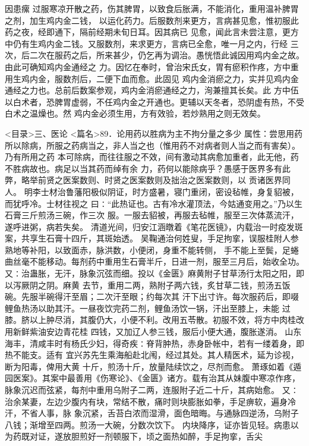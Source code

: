 \documentclass[a4paper,12pt,UTF8,twoside]{ctexbook}
\begin{document}
因患瘰 过服寒凉开散之药，伤其脾胃，以致食后胀满，不能消化，重用温补脾胃之剂，加生鸡内金二钱， 
以运化药力。后服数剂来更方，言病甚见愈，惟初服此药之夜，经即通下，隔前经期未旬日耳。因其病已 
见愈，闻此言未尝注意，更方中仍有生鸡内金二钱。又服数剂，来求更方，言病已全愈，唯一月之内，行经 
三次，后二次在服药之后，所来甚少，仍乞再为调治。愚恍悟此诚因用鸡内金之故。由此可确知鸡内金通经之 
力。因忆在奉时，曾治宋氏女，胃有瘀积作疼，方中重用生鸡内金，服数剂后，二便下血而愈。此固见 
鸡内金消瘀之力，实并见鸡内金通经之力也。总前后数案参观，鸡内金消瘀通经之力，洵兼擅其长矣。此 
方中伍以白术者，恐脾胃虚弱，不任鸡内金之开通也。更辅以天冬者，恐阴虚有热，不受白术之温燥也。然 
鸡内金必须生用，方有效验，若炒熟用之则无效矣。 

<目录>三、医论
<篇名>89．论用药以胜病为主不拘分量之多少
属性：尝思用药所以除病，所服之药病当之，非人当之也（惟用药不对病者则人当之而有害矣）。乃有所用之药 
本可除病，而往往服之不效，间有激动其病愈加重者，此无他，药不胜病故也。病足以当其药而绰有余 
力，药何以能除病乎？愚感于医界多有此弊，略举前贤之医案数则、时贤之医案数则及拙治之医案数则，以 
贡诸医界同人。 
明李士材治鲁藩阳极似阴证，时方盛暑，寝门重闭，密设毡帷，身复貂被，而犹呼冷。士材往视之 
曰∶“此热证也。古有冷水灌顶法，今姑通变用之。”乃以生石膏三斤煎汤三碗，作三次 
服。一服去貂被，再服去毡帷，服至三次体蒸流汗，遂呼进粥，病若失矣。 
清道光间，归安江涵暾着《笔花医镜》，内载治一时疫发斑案，共享生石膏十四斤，其斑始透。 
吴鞠通治何姓叟，手足拘挛，误服桂附人参熟地等补阳，以致面赤，脉洪数，小便闭，身重不能转侧， 
手不能上至鬓，足蜷曲丝毫不能移动。每剂药中重用生石膏半斤，日进一剂，服至三月后，始收全功。 
又∶治蛊胀，无汗，脉象沉弦而细。投以《金匮》麻黄附子甘草汤行太阳之阳，即以泻厥阴之阴。麻黄 
去节，重用二两，熟附子两六钱，炙甘草二钱，煎汤五饭碗。先服半碗得汗至眉；二次汗至眼；约每次其 
汗下出寸许。每次服药后，即啜鲤鱼热汤以助其汗。一昼夜饮完药二剂，鲤鱼汤饮一锅，汗出至膝上，未能 
过膝。脐以上肿尽消，其腹仍大，小便不利。改用五苓散。初服不效，将方中肉桂改用新鲜紫油安边青花桂 
四钱，又加辽人参三钱，服后小便大通，腹胀遂消。 
山东海丰，清咸丰时有杨氏少妇，得奇疾∶脊背肿热，赤身卧帐中，若有一缕着身，即热不能支。适有 
宜兴苏先生乘海船赴北闱，经过其处。其人精医术，延为诊视，断为阳毒，俾用大黄 
十斤，煎汤十斤，放量陆续饮之，尽剂而愈。 
萧琢如着《遁园医案》。其案中最善用《伤寒论》、《金匮》诸方。载有治其从妹腹中寒凉作疼， 
脉象沉迟而弦紧，每剂中重用乌附子二两，连服附子近二十斤，其病始愈。 
又∶治余某妻，左边少腹内有块，常结不散，痛时则块膨胀如拳，手足痹软，遍身冷汗，不省人事，脉 
象沉紧，舌苔白浓而湿滑，面色暗晦。与通脉四逆汤，乌附子八钱；渐增至四两。煎汤一大碗，分数次饮下。 
内块降序，证亦皆见轻。病患以为药既对证，遂放胆煎好一剂顿服下，顷之面热如醉，手足拘挛，舌尖 
\end{document}
